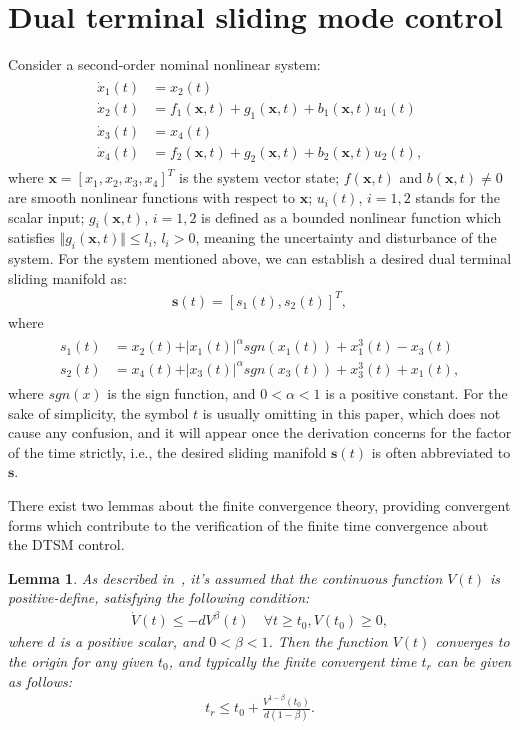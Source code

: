 \documentclass[3p]{elsarticle}
\theoremstyle{plain}
\newtheorem{mylem}{Lemma}
\theoremstyle{remark}
\begin{document}
\section{Dual terminal sliding mode control}\label{sec:2}
Consider a second-order nominal nonlinear system:
\begin{align}
\begin{split}
\dot x_1(t) &= x_2(t)\\
\dot x_2(t) &= f_1(\bm x,t)+g_1(\bm x,t)+b_1(\bm x,t)u_1(t)\\
\dot x_3(t) &= x_4(t)\\
\dot x_4(t) &= f_2(\bm x,t)+g_2(\bm x,t)+b_2(\bm x,t)u_2(t),\label{eq:second-order system}
\end{split}
\end{align}
where $\bm x = [x_1,x_2,x_3,x_4]^T$ is the system vector state; $f(\bm x,t)$ and $b(\bm x,t)\neq 0$ are smooth nonlinear functions with respect to $\bm x$; $u_i(t)$, $i=1,2$ stands for the scalar input; $g_i(\bm x,t)$, $i=1,2$  is defined as a bounded nonlinear function which satisfies $\Vert g_i(\bm x,t)\Vert\le l_i$, $l_i>0$, meaning the uncertainty and disturbance of the system. For the system mentioned above, we can establish a desired dual terminal sliding manifold as:
\begin{align}
\bm s(t) = [s_1(t),s_2(t)]^T,
\end{align}
where
\begin{align}
\begin{split}
s_1(t) &= x_2(t)+\vert x_1(t)\vert^{\alpha} sgn(x_1(t))+x_1^3(t)-x_3(t)\\
s_2(t) &= x_4(t)+\vert x_3(t)\vert^{\alpha} sgn(x_3(t))+x_3^3(t)+x_1(t),\label{eq:dual sliding manifold}
\end{split}
\end{align}
where $sgn(x)$ is the sign function, and $0<\alpha<1$ is a positive constant. For the sake of simplicity, the symbol $t$ is usually omitting in this paper, which does not cause any confusion, and it will appear once the derivation concerns for the factor of the time strictly, i.e., the desired sliding manifold $\bm s(t)$ is often abbreviated to $\bm s$.\par
There exist two lemmas about the finite convergence theory, providing convergent forms which contribute to the verification of the finite time convergence about the DTSM control.
\begin{mylem}
As described in~\cite{moulay2006finite}, it's assumed that the continuous function $V(t)$ is positive-define, satisfying the following condition:
\begin{align}
\dot V(t)\le -dV^\beta(t)\quad\forall t\ge t_0, V(t_0)\ge 0,
\end{align}
where $d$ is a positive scalar, and $0<\beta<1$. Then the function $V(t)$ converges to the origin for any given $t_0$, and typically the finite convergent time $t_r$ can be given as follows:
\begin{align}
t_r \le t_0+\frac{V^{1-\beta}(t_0)}{d(1-\beta)}.
\end{align}\label{lemma:1}
\end{mylem}
\end{document}
